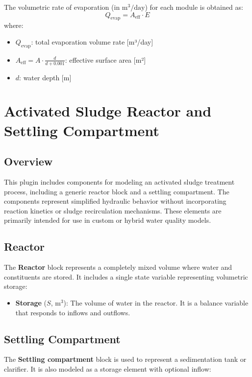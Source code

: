 \documentclass[12pt]{report}
\begin{document}
The volumetric rate of evaporation (in $\text{m}^3/\text{day}$) for each module is obtained as:
\begin{equation}
Q_{\text{evap}} = A_{\text{eff}} \cdot E
\end{equation}
where:
\begin{itemize}
\item $Q_{\text{evap}}$: total evaporation volume rate [m³/day]
\item $A_{\text{eff}} = A \cdot \frac{d}{d+0.001}$: effective surface area [m²]
\item $d$: water depth [m]
\end{itemize}

\chapter{Activated Sludge Reactor and Settling Compartment}

\section{Overview}
This plugin includes components for modeling an activated sludge treatment process, including a generic reactor block and a settling compartment. The components represent simplified hydraulic behavior without incorporating reaction kinetics or sludge recirculation mechanisms. These elements are primarily intended for use in custom or hybrid water quality models.

\section{Reactor}
The \textbf{Reactor} block represents a completely mixed volume where water and constituents are stored. It includes a single state variable representing volumetric storage:

\begin{itemize}
\item \textbf{Storage} ($S$, m$^3$): The volume of water in the reactor. It is a balance variable that responds to inflows and outflows.
\end{itemize}

\section{Settling Compartment}
The \textbf{Settling compartment} block is used to represent a sedimentation tank or clarifier. It is also modeled as a storage element with optional inflow:
\end{document}
